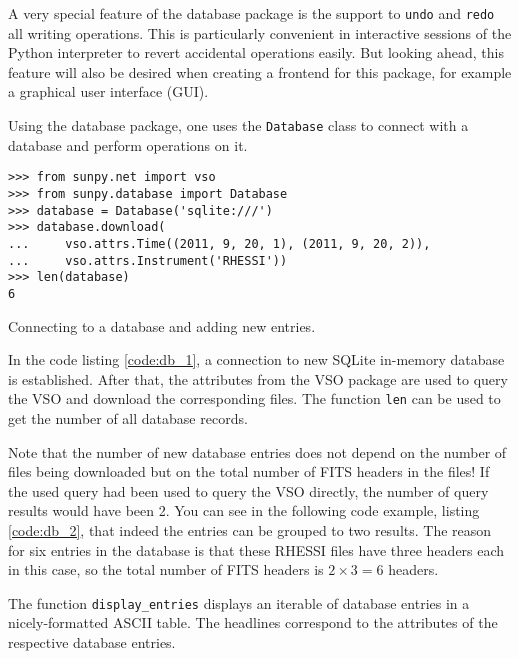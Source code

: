 A very special feature of the database package is the support to \texttt{undo}
and \texttt{redo} all writing operations. This is particularly convenient in
interactive sessions of the Python interpreter to revert accidental operations
easily. But looking ahead, this feature will also be desired when creating a
frontend for this package, for example a graphical user interface
(\textsc{GUI}).

Using the database package, one uses the \texttt{Database} class to connect
with a database and perform operations on it.

\begin{listing}[H]
\begin{verbatim}
>>> from sunpy.net import vso
>>> from sunpy.database import Database
>>> database = Database('sqlite:///')
>>> database.download(
...     vso.attrs.Time((2011, 9, 20, 1), (2011, 9, 20, 2)),
...     vso.attrs.Instrument('RHESSI'))
>>> len(database)
6
\end{verbatim}
\caption{Connecting to a database and adding new entries.}
\label{code:db_1}
\end{listing}

In the code listing \ref{code:db_1}, a connection to new SQLite in-memory
database is established. After that, the attributes from the \textsc{VSO}
package are used to query the \textsc{VSO} and download the corresponding
files. The function \texttt{len} can be used to get the number of all database
records.

Note that the number of new database entries does not depend on the
number of files being downloaded but on the total number of \textsc{FITS}
headers in the files! If the used query had been used to query the \textsc{VSO}
directly, the number of query results would have been 2. You can see in the
following code example, listing \ref{code:db_2}, that indeed the entries can
be grouped to two results. The reason for six entries in the database is that
these RHESSI files have three headers each in this case, so the total number of
FITS headers is $2 \times 3 = 6$ headers.

The function \texttt{display\_entries} displays an iterable of database entries
in a nicely-formatted \textsc{ASCII} table. The headlines correspond to the
attributes of the respective database entries.

